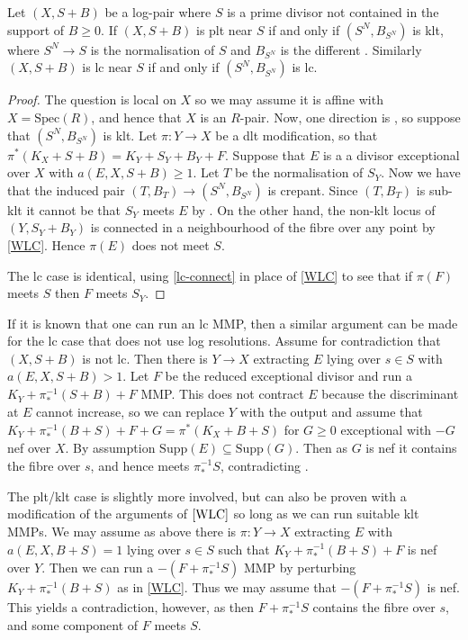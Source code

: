 \begin{theorem}\label{t-inv_adj}
	Let $(X,S+B)$ be a log-pair where $S$ is a prime divisor not contained in the support of $B \geq 0$. If $(X,S+B)$ is plt near $S$ if and only if $(S^{N},B_{S^{N}})$ is klt, where $S^{N} \to S$ is the normalisation of $S$ and $B_{S^{N}}$ is the different \cite[Definition 4.2]{kk-singbook}. Similarly $(X,S+B)$ is lc near $S$ if and only if $(S^{N},B_{S^{N}})$ is lc.
\end{theorem}

\begin{proof}
	The question is local on $X$ so we may assume it is affine with $X=\text{Spec}(R)$, and hence that $X$ is an $R$-pair. Now, one direction is \cite[Lemma 4.8]{kk-singbook}, so suppose that $(S^{N},B_{S^{N}})$ is klt. Let $\pi\colon Y \to X$ be a dlt modification, so that $\pi^{*}(K_{X}+S+B)=K_{Y}+S_{Y}+B_{Y}+F$. Suppose that $E$ is a a divisor exceptional over $X$ with $a(E,X,S+B) \geq 1$. Let $T$ be the normalisation of $S_{Y}$. Now we have that the induced pair $(T,B_{T})\to (S^{N},B_{S^{N}})$ is crepant. Since $(T,B_{T})$ is sub-klt it cannot be that $S_{Y}$ meets $E$ by \cite[Claim 4.7.3]{kk-singbook}. On the other hand, the non-klt locus of $(Y,S_{Y}+B_{Y})$ is connected in a neighbourhood of the fibre over any point by \autoref{WLC}. Hence $\pi(E)$ does not meet $S$.
	
	The lc case is identical, using \autoref{lc-connect} in place of \autoref{WLC} to see that if $\pi(F)$ meets $S$ then $F$ meets $S_{Y}$. 
\end{proof}

\begin{remark}\label{no-res}
	
	If it is known that one can run an lc MMP, then a similar argument can be made for the lc case that does not use log resolutions. Assume for contradiction that $(X,S+B)$ is not lc. Then there is $Y \to X$ extracting $E$ lying over $s \in S$ with $a(E,X,S+B)> 1$. Let $F$ be the reduced exceptional divisor and run a $K_{Y}+\pi_{*}^{-1}(S+B)+F$ MMP. This does not contract $E$ because the discriminant at $E$ cannot increase, so we can replace $Y$ with the output and assume that $K_{Y}+\pi_{*}^{-1}(B+S)+F+G=\pi^{*}(K_{X}+B+S)$ for $G\geq0$ exceptional with $-G$ nef over $X$. By assumption $\text{Supp}(E) \subseteq \text{Supp}(G)$. Then as $G$ is nef it contains the fibre over $s$, and hence meets $\pi_{*}^{-1}S$, contradicting \cite[Claim 4.7.3]{kk-singbook}.
	
	The plt/klt case is slightly more involved, but can also be proven with a modification of the arguments of $\autoref{WLC}$ so long as we can run suitable klt MMPs. We may assume as above there is $\pi \colon Y \to X$ extracting $E$ with $a(E,X,B+S)=1$ lying over $s \in S$ such that $K_{Y}+\pi_{*}^{-1}(B+S)+F$ is nef over $Y$. Then we can run a $-(F+\pi_{*}^{-1}S)$ MMP by perturbing $K_{Y}+\pi_{*}^{-1}(B+S)$ as in \autoref{WLC}. Thus we may assume that $-(F+\pi_{*}^{-1}S)$ is nef. This yields a contradiction, however, as then $F+\pi_{*}^{-1}S$ contains the fibre over $s$, and some component of $F$ meets $S$.
	\end{remark}

